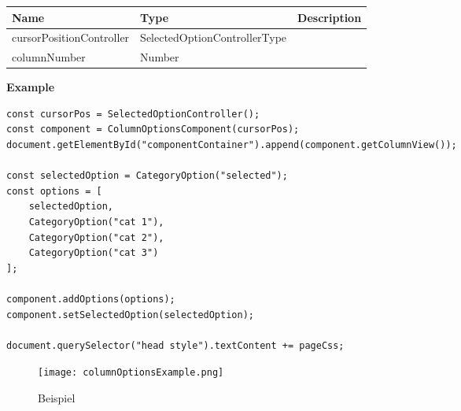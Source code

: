 \begin{table}[!htb] 
    \label{api:columnOptionsComponentParameter}
    \footnotesize
    \setlength\extrarowheight{4pt}
    \begin{tabular}{ p{3.2cm} p{4.2cm} p{5.6cm} }
        \toprule[1.2pt]
        \textbf{Name}            & \textbf{Type}                & \textbf{Description} \\
        \midrule
        cursorPositionController & SelectedOptionControllerType &  \\
        columnNumber             & Number                       &  \\
        \bottomrule[1.2pt]
    \end{tabular}
\end{table}

\vspace*{6pt}
\noindent
\textbf{Example}

\begin{lstlisting}[style = htmlcssjs, label = api:columnOptionsComponentExample]
const cursorPos = SelectedOptionController();
const component = ColumnOptionsComponent(cursorPos);
document.getElementById("componentContainer").append(component.getColumnView());

const selectedOption = CategoryOption("selected");
const options = [ 
    selectedOption,
    CategoryOption("cat 1"),
    CategoryOption("cat 2"),
    CategoryOption("cat 3") 
];

component.addOptions(options);
component.setSelectedOption(selectedOption);

document.querySelector("head style").textContent += pageCss;
\end{lstlisting}

\begin{figure}[!htb]
    \centering
    \texttt{[image: columnOptionsExample.png]}
    \caption*{\centering Beispiel }
    \label{api:columnOptionsComponentImg}
\end{figure}

